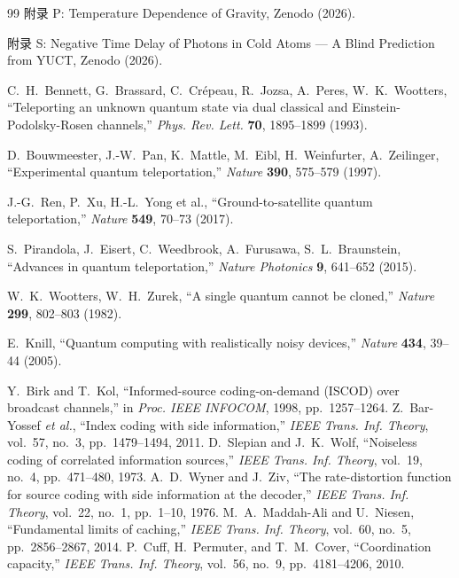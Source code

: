 \documentclass[12pt,a4paper]{article}
\theoremstyle{remark}
\begin{document}
\begin{thebibliography}{99}
		附录 P: Temperature Dependence of Gravity, Zenodo (2026).
		
		附录 S: Negative Time Delay of Photons in Cold Atoms — A Blind Prediction from YUCT, Zenodo (2026).
		
		 C.~H.~Bennett, G.~Brassard, C.~Crépeau, R.~Jozsa, A.~Peres, W.~K.~Wootters,
		``Teleporting an unknown quantum state via dual classical and Einstein-Podolsky-Rosen channels,''
		\emph{Phys. Rev. Lett.} \textbf{70}, 1895--1899 (1993).
		
		 D.~Bouwmeester, J.-W.~Pan, K.~Mattle, M.~Eibl, H.~Weinfurter, A.~Zeilinger,
		``Experimental quantum teleportation,''
		\emph{Nature} \textbf{390}, 575--579 (1997).
		
		 J.-G.~Ren, P.~Xu, H.-L.~Yong et al.,
		``Ground-to-satellite quantum teleportation,''
		\emph{Nature} \textbf{549}, 70--73 (2017).
		
		 S.~Pirandola, J.~Eisert, C.~Weedbrook, A.~Furusawa, S.~L.~Braunstein,
		``Advances in quantum teleportation,''
		\emph{Nature Photonics} \textbf{9}, 641--652 (2015).
		
		 W.~K.~Wootters, W.~H.~Zurek,
		``A single quantum cannot be cloned,''
		\emph{Nature} \textbf{299}, 802--803 (1982).
		
		 E.~Knill,
		``Quantum computing with realistically noisy devices,''
		\emph{Nature} \textbf{434}, 39--44 (2005).
		
		 Y.~Birk and T.~Kol, ``Informed-source coding-on-demand (ISCOD) over broadcast channels,'' in \emph{Proc. IEEE INFOCOM}, 1998, pp.~1257--1264.
		 Z.~Bar-Yossef \emph{et al.}, ``Index coding with side information,'' \emph{IEEE Trans. Inf. Theory}, vol.~57, no.~3, pp.~1479--1494, 2011.
		 D.~Slepian and J.~K.~Wolf, ``Noiseless coding of correlated information sources,'' \emph{IEEE Trans. Inf. Theory}, vol.~19, no.~4, pp.~471--480, 1973.
		 A.~D.~Wyner and J.~Ziv, ``The rate-distortion function for source coding with side information at the decoder,'' \emph{IEEE Trans. Inf. Theory}, vol.~22, no.~1, pp.~1--10, 1976.
		 M.~A.~Maddah-Ali and U.~Niesen, ``Fundamental limits of caching,'' \emph{IEEE Trans. Inf. Theory}, vol.~60, no.~5, pp.~2856--2867, 2014.
		 P.~Cuff, H.~Permuter, and T.~M.~Cover, ``Coordination capacity,'' \emph{IEEE Trans. Inf. Theory}, vol.~56, no.~9, pp.~4181--4206, 2010.
		
	\end{thebibliography}
	
\end{document}
